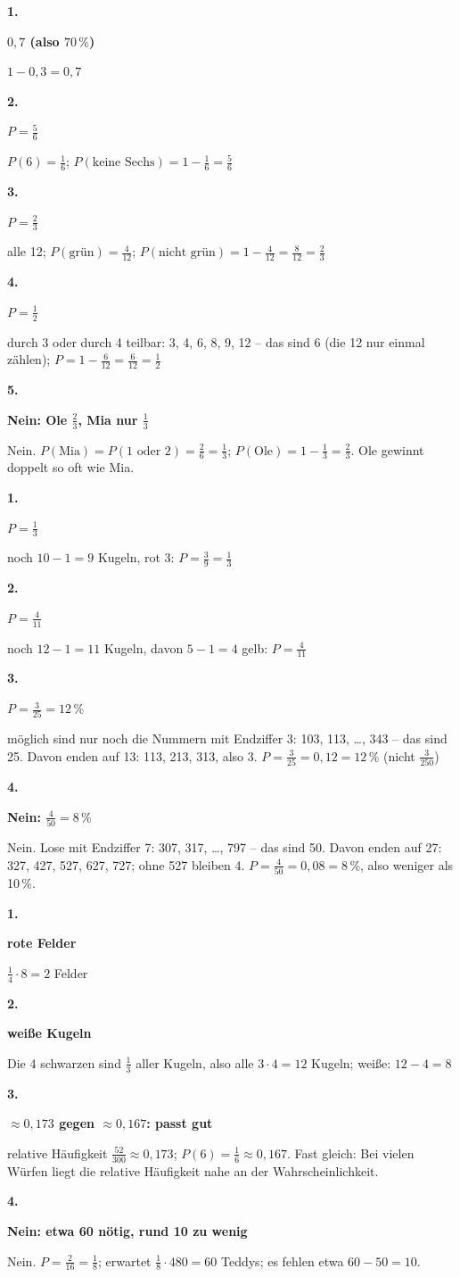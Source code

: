 \documentclass[11pt]{article}
\newcommand{\lsg}[3]{\par\noindent\begin{minipage}[t]{9mm}\textbf{#1}\end{minipage}%
  \begin{minipage}[t]{52mm}\raggedright\bfseries\boldmath #2\end{minipage}\hspace{3mm}%
  \begin{minipage}[t]{\dimexpr\linewidth-64mm\relax}\raggedright\small #3\end{minipage}\par\vspace{4pt}}
\begin{document}
\lsg{1.}{$0{,}7$ (also $70\,\%$)}{$1 - 0{,}3 = 0{,}7$}
\lsg{2.}{$P = \frac{5}{6}$}{$P(6) = \frac{1}{6}$; $P(\text{keine Sechs}) = 1 - \frac{1}{6} = \frac{5}{6}$}
\lsg{3.}{$P = \frac{2}{3}$}{alle 12; $P(\text{grün}) = \frac{4}{12}$; $P(\text{nicht grün}) = 1 - \frac{4}{12} = \frac{8}{12} = \frac{2}{3}$}
\lsg{4.}{$P = \frac{1}{2}$}{durch 3 oder durch 4 teilbar: 3, 4, 6, 8, 9, 12 – das sind 6 (die 12 nur einmal zählen); $P = 1 - \frac{6}{12} = \frac{6}{12} = \frac{1}{2}$}
\lsg{5.}{Nein: Ole $\frac{2}{3}$, Mia nur $\frac{1}{3}$}{Nein. $P(\text{Mia}) = P(1 \text{ oder } 2) = \frac{2}{6} = \frac{1}{3}$; $P(\text{Ole}) = 1 - \frac{1}{3} = \frac{2}{3}$. Ole gewinnt doppelt so oft wie Mia.}
\par\Needspace{25mm}\vspace{6pt}\noindent\colorbox{black!12}{}\hspace{2mm}{\bfseries Wenn sich die Grundmenge ändert}\par\vspace{4pt}
\lsg{1.}{$P = \frac{1}{3}$}{noch $10 - 1 = 9$ Kugeln, rot 3: $P = \frac{3}{9} = \frac{1}{3}$}
\lsg{2.}{$P = \frac{4}{11}$}{noch $12 - 1 = 11$ Kugeln, davon $5 - 1 = 4$ gelb: $P = \frac{4}{11}$}
\lsg{3.}{$P = \frac{3}{25} = 12\,\%$}{möglich sind nur noch die Nummern mit Endziffer 3: 103, 113, \ldots, 343 – das sind 25. Davon enden auf 13: 113, 213, 313, also 3. $P = \frac{3}{25} = 0{,}12 = 12\,\%$ (nicht $\frac{3}{250}$)}
\lsg{4.}{Nein: $\frac{4}{50} = 8\,\%$}{Nein. Lose mit Endziffer 7: 307, 317, \ldots, 797 – das sind 50. Davon enden auf 27: 327, 427, 527, 627, 727; ohne 527 bleiben 4. $P = \frac{4}{50} = 0{,}08 = 8\,\%$, also weniger als 10\,\%.}
\par\Needspace{25mm}\vspace{6pt}\noindent\colorbox{black!12}{}\hspace{2mm}{\bfseries Zufallsgerät bauen und vorhersagen}\par\vspace{4pt}
\lsg{1.}{2 rote Felder}{$\frac{1}{4} \cdot 8 = 2$ Felder}
\lsg{2.}{8 weiße Kugeln}{Die 4 schwarzen sind $\frac{1}{3}$ aller Kugeln, also alle $3 \cdot 4 = 12$ Kugeln; weiße: $12 - 4 = 8$}
\lsg{3.}{$\approx 0{,}173$ gegen $\approx 0{,}167$: passt gut}{relative Häufigkeit $\frac{52}{300} \approx 0{,}173$; $P(6) = \frac{1}{6} \approx 0{,}167$. Fast gleich: Bei vielen Würfen liegt die relative Häufigkeit nahe an der Wahrscheinlichkeit.}
\lsg{4.}{Nein: etwa 60 nötig, rund 10 zu wenig}{Nein. $P = \frac{2}{16} = \frac{1}{8}$; erwartet $\frac{1}{8} \cdot 480 = 60$ Teddys; es fehlen etwa $60 - 50 = 10$.}
\end{document}
